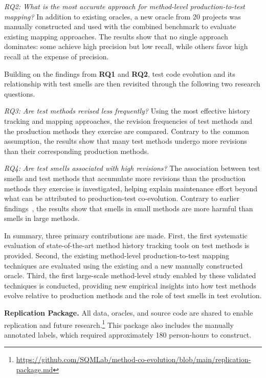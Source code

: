 \emph{RQ2: What is the most accurate approach for method-level production-to-test mapping?} In addition to existing oracles, a new oracle from 20 projects was manually constructed and used with the combined benchmark to evaluate existing mapping approaches. The results show that no single approach dominates: some achieve high precision but low recall, while others favor high recall at the expense of precision.

Building on the findings from \textbf{RQ1} and \textbf{RQ2}, test code evolution and its relationship with test smells are then revisited through the following two research questions.

\emph{RQ3: Are test methods revised less frequently?} Using the most effective history tracking and mapping approaches, the revision frequencies of test methods and the production methods they exercise are compared. Contrary to the common assumption, the results show that many test methods undergo more revisions than their corresponding production methods.

\emph{RQ4: Are test smells associated with high revisions?} The association between test smells and test methods that accumulate more revisions than the production methods they exercise is investigated, helping explain maintenance effort beyond what can be attributed to production-test co-evolution. Contrary to earlier findings~\cite{Spadini:2018}, the results show that smells in small methods are more harmful than smells in large methods.


In summary, three primary contributions are made. First, the first systematic evaluation of state-of-the-art method history tracking tools on test methods is provided. Second, the existing method-level production-to-test mapping techniques are evaluated using the existing and a new manually constructed oracle. Third, the first large-scale method-level study enabled by these validated techniques is conducted, providing new empirical insights into how test methods evolve relative to production methods and the role of test smells in test evolution.

\textbf{Replication Package.} All data, oracles, and source code are shared to enable replication and future research.\footnote{\href{https://github.com/SQMLab/method-co-evolution/blob/main/replication-package.md}{https://github.com/SQMLab/method-co-evolution/blob/main/replication-package.md}} This package also includes the manually annotated labels, which required approximately 180 person-hours to construct.

